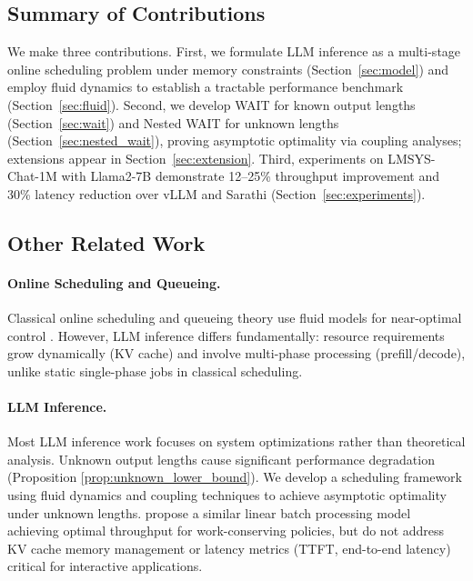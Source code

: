 \subsection{Summary of Contributions}

We make three contributions. First, we formulate LLM inference as a multi-stage online scheduling problem under memory constraints (Section~\ref{sec:model}) and employ fluid dynamics to establish a tractable performance benchmark (Section~\ref{sec:fluid}). Second, we develop WAIT for known output lengths (Section~\ref{sec:wait}) and Nested WAIT for unknown lengths (Section~\ref{sec:nested_wait}), proving asymptotic optimality via coupling analyses; extensions appear in Section~\ref{sec:extension}. Third, experiments on LMSYS-Chat-1M with Llama2-7B demonstrate 12--25\% throughput improvement and 30\% latency reduction over vLLM \citep{kwon2023efficient} and Sarathi \citep{agrawal2023sarathi} (Section~\ref{sec:experiments}).

\subsection{Other Related Work}

\paragraph*{Online Scheduling and Queueing.}
Classical online scheduling \cite{devanur2009adwords,vee2010optimal,cole2014sample,balkanski2016power,lattanzi2020online,im2013online,lucier2013efficient,liu2015online,li2020online} and queueing theory use fluid models for near-optimal control \cite{mandelbaum1998strong,maglaras2000discrete,bauerle2002optimal,liu2011network}. However, LLM inference differs fundamentally: resource requirements grow dynamically (KV cache) and involve multi-phase processing (prefill/decode), unlike static single-phase jobs in classical scheduling.

\paragraph*{LLM Inference.}
Most LLM inference work focuses on system optimizations \cite{patel2023peeling,zhong2024distserve,yu2022orca,agrawal2023sarathi,agrawal2024taming,deepseekai2024deepseekv2strongeconomicalefficient,fu2025efficient} rather than theoretical analysis. Unknown output lengths cause significant performance degradation (Proposition \ref{prop:unknown_lower_bound}). We develop a scheduling framework using fluid dynamics and coupling techniques to achieve asymptotic optimality under unknown lengths. \cite{li2025throughput} propose a similar linear batch processing model achieving optimal throughput for work-conserving policies, but do not address KV cache memory management or latency metrics (TTFT, end-to-end latency) critical for interactive applications.


